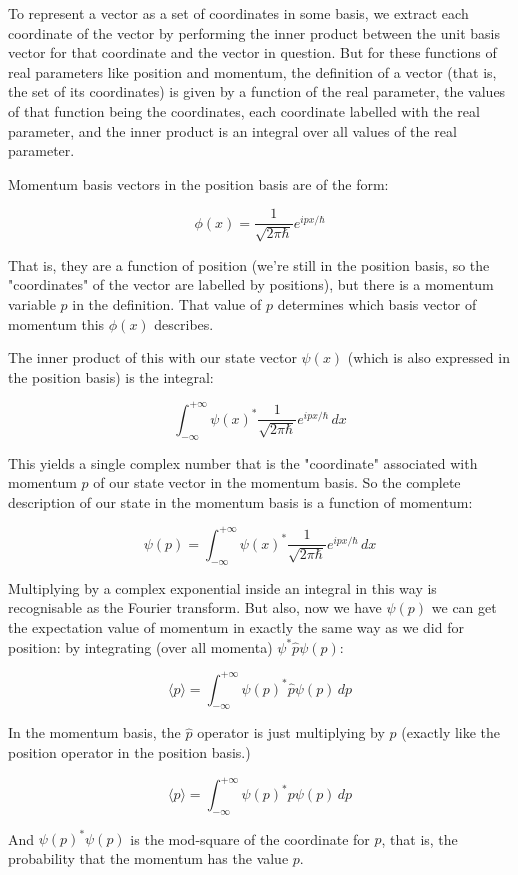 To represent a vector as a set of coordinates in some basis, we extract each coordinate of the vector by performing the inner product between the unit basis vector for that coordinate and the vector in question. But for these functions of real parameters like position and momentum, the definition of a vector (that is, the set of its coordinates) is given by a function of the real parameter, the values of that function being the coordinates, each coordinate labelled with the real parameter, and the inner product is an integral over all values of the real parameter.

Momentum basis vectors in the position basis are of the form:

$$
\phi(x) = \frac{1}{\sqrt{2\pi\hbar}}e^{ipx/\hbar}
$$

That is, they are a function of position (we're still in the position basis, so the "coordinates" of the vector are labelled by positions), but there is a momentum variable $p$ in the definition. That value of $p$ determines which basis vector of momentum this $\phi(x)$ describes.

The inner product of this with our state vector $\psi(x)$ (which is also expressed in the position basis) is the integral:

$$
\int_{-\infty}^{+\infty}
\psi(x)^*
\frac{1}{\sqrt{2\pi\hbar}}e^{ipx/\hbar}
\,dx
$$

This yields a single complex number that is the "coordinate" associated with momentum $p$ of our state vector in the momentum basis. So the complete description of our state in the momentum basis is a function of momentum:

$$
\psi(p) = \int_{-\infty}^{+\infty}
\psi(x)^*
\frac{1}{\sqrt{2\pi\hbar}}e^{ipx/\hbar}
\,dx
$$

Multiplying by a complex exponential inside an integral in this way is recognisable as the Fourier transform. But also, now we have $\psi(p)$ we can get the expectation value of momentum in exactly the same way as we did for position: by integrating (over all momenta) $\psi^* \hat{p} \psi(p)$:

$$
\langle p \rangle =
\int_{-\infty}^{+\infty}
\psi(p)^*
\hat{p}
\psi(p)
\,dp
$$

In the momentum basis, the $\hat{p}$ operator is just multiplying by $p$ (exactly like the position operator in the position basis.)

$$
\langle p \rangle =
\int_{-\infty}^{+\infty}
\psi(p)^*
p
\psi(p)
\,dp
$$

And $\psi(p)^*\psi(p)$ is the mod-square of the coordinate for $p$, that is, the probability that the momentum has the value $p$. 

